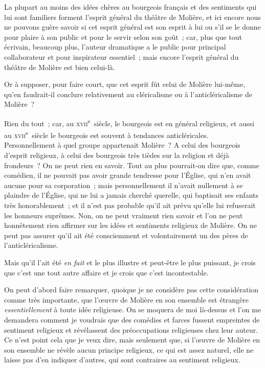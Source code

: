 \documentclass[french,twoside]{book} %
\begin{document}
La plupart au moins des idées chères au bourgeois français et des sentiments qui lui sont familiers forment l’esprit général du théâtre de Molière, et ici encore nous ne pouvons guère savoir si cet esprit général est son esprit à lui ou s’il se le donne pour plaire à son public et pour le servir selon son goût ; car, plus que tout écrivain, beaucoup plus, l’auteur dramatique a le public pour principal collaborateur et pour inspirateur essentiel ; mais encore l’esprit général du théâtre de Molière est bien celui-là.\par
Or à supposer, pour faire court, que cet esprit fût celui de Molière lui-même, qu’en faudrait-il conclure relativement au cléricalisme ou à l’anticléricalisme de Molière ?\par
Rien du tout ; car, au \textsc{xvii}\textsuperscript{e} siècle, le bourgeois est en général religieux, et aussi au \textsc{xvii}\textsuperscript{e} siècle le bourgeois est souvent à tendances anticléricales.  Personnellement à quel groupe appartenait Molière ? A celui des bourgeois d’esprit religieux, à celui des bourgeois très tièdes sur la religion et déjà frondeurs ? On ne peut rien en savoir. Tout au plus pourrait-on dire que, comme comédien, il ne pouvait pas avoir grande tendresse pour l’Église, qui n’en avait aucune pour sa corporation ; mais personnellement il n’avait nullement à se plaindre de l’Église, qui ne lui a jamais cherché querelle, qui baptisait ses enfants très honorablement ; et il n’est pas probable qu’il ait prévu qu’elle lui refuserait les honneurs suprêmes. Non, on ne peut vraiment rien savoir et l’on ne peut honnêtement rien affirmer sur les idées et sentiments religieux de Molière. On ne peut pas assurer qu’il ait été consciemment et volontairement un des pères de l’anticléricalisme.\par
Mais qu’il l’ait été {\itshape en fait} et le plus illustre et peut-être le plus puissant, je crois que c’est une tout autre affaire et je crois que c’est incontestable.\par
On peut d’abord faire remarquer, quoique je ne considère pas cette considération comme très importante, que l’œuvre de Molière en son ensemble est étrangère {\itshape essentiellement} à toute idée religieuse. On se moquera de moi là-dessus et l’on me demandera comment je voudrais que des comédies  et farces fussent empreintes de sentiment religieux et révélassent des préoccupations religieuses chez leur auteur. Ce n’est point cela que je veux dire, mais seulement que, si l’œuvre de Molière en son ensemble ne révèle aucun principe religieux, ce qui est assez naturel, elle ne laisse pas d’en indiquer d’autres, qui sont contraires au sentiment religieux.\par
\end{document}
